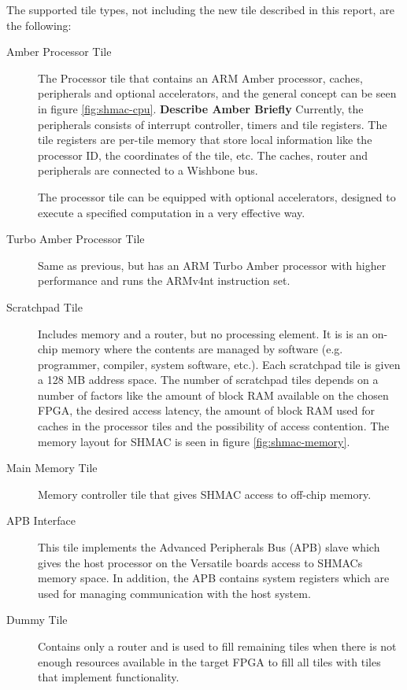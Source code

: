 The supported tile types, not including the new tile described in this report, are the following:
\begin{description}
  \item[Amber Processor Tile] The Processor tile that contains an ARM Amber processor, caches, peripherals and optional accelerators, and the general concept can be seen in figure \ref{fig:shmac-cpu}.
  \textbf{Describe Amber Briefly}
  Currently, the peripherals consists of interrupt controller, timers and tile registers.
  The tile registers are per-tile memory that store local information like the processor ID, the coordinates of the tile, etc. 
  The caches, router and peripherals are connected to a Wishbone bus.
  
%  
  The processor tile can be equipped with optional accelerators, designed to execute a specified computation in a very effective way.
%  
%  
  \item[Turbo Amber Processor Tile] Same as previous, but has an ARM Turbo Amber processor with higher performance and runs the ARMv4nt instruction set. \cite{turboamber}
  \item[Scratchpad Tile] Includes memory and a router, but no processing element. 
  It is is an on-chip memory where the contents are managed by software (e.g. programmer, compiler, system software, etc.).
  Each scratchpad tile is given a 128 MB address space.
  The number of scratchpad tiles depends on a number of factors like the amount of block RAM available on the chosen FPGA, the desired access latency, the amount of block RAM used for caches in the processor tiles and the possibility of access contention\cite{shmac-plan}.
  The memory layout for SHMAC is seen in figure \ref{fig:shmac-memory}.
  \item[Main Memory Tile] Memory controller tile that gives SHMAC access to off-chip memory.
  \item[APB Interface] This tile implements the Advanced Peripherals Bus (APB) slave which gives the host processor on the Versatile boards access to SHMACs memory space. 
  In addition, the APB contains system registers which are used for managing communication with the host system.
  \item[Dummy Tile] Contains only a router and is used to fill remaining tiles when there is not enough resources available in the target FPGA to fill all tiles with tiles that implement functionality.\end{description}


